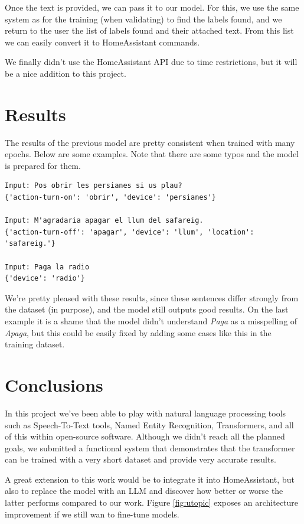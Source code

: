 \documentclass{article}
\begin{document}
Once the text is provided, we can pass it to our model. For this, we use the same system as for the training (when validating) to find the labels found, and we return to the user the list of labels found and their attached text. From this list we can easily convert it to HomeAssistant commands.

We finally didn't use the HomeAssistant API due to time restrictions, but it will be a nice addition to this project.

\section{Results}

The results of the previous model are pretty consistent when trained with many epochs.
Below are some examples. Note that there are some typos and the model is prepared for them.

\begin{verbatim}
Input: Pos obrir les persianes si us plau?
{'action-turn-on': 'obrir', 'device': 'persianes'}

Input: M'agradaria apagar el llum del safareig.
{'action-turn-off': 'apagar', 'device': 'llum', 'location': 'safareig.'}

Input: Paga la radio
{'device': 'radio'}
\end{verbatim}

We're pretty pleased with these results, since these sentences differ strongly from the dataset (in purpose), and the model still outputs good results. On the last example it is a shame that the model didn't understand \textit{Paga} as a misspelling of \textit{Apaga}, but this could be easily fixed by adding some cases like this in the training dataset.

\section{Conclusions}

In this project we've been able to play with natural language processing tools such as Speech-To-Text tools, Named Entity Recognition, Transformers, and all of this within open-source software. Although we didn't reach all the planned goals, we submitted a functional system that demonstrates that the transformer can be trained with a very short dataset and provide very accurate results.

A great extension to this work would be to integrate it into HomeAssistant, but also to replace the model with an LLM and discover how better or worse the latter performs compared to our work.
Figure \ref{fig:utopic} exposes an architecture improvement if we still wan to fine-tune models.
\end{document}
